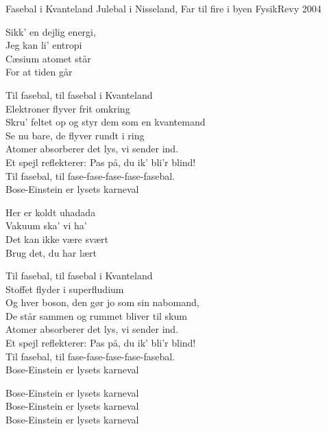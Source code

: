 \begin{song}{Fasebal i Kvanteland}
  {} %
  {Julebal i Nisseland, Far til fire i byen} %
  {} %
  {FysikRevy 2004} %
  {\NotCCLIed} %

  \begin{SBVerse}
    Sikk' en dejlig energi,\\
    Jeg kan li' entropi\\
    Cæsium atomet står\\
    For at tiden går
  \end{SBVerse}

  \begin{SBChorus}
    Til fasebal, til fasebal i Kvanteland\\
    Elektroner flyver frit omkring\\
    Skru' feltet op og styr dem som en kvantemand\\
    Se nu bare, de flyver rundt i ring\\\medskip
    Atomer absorberer det lys, vi sender ind.\\
    Et spejl reflekterer: Pas på, du ik' bli'r blind!\\
    Til fasebal, til fase-fase-fase-fase-fasebal.\\
    Bose-Einstein er lysets karneval
  \end{SBChorus}

  \begin{SBVerse}
    Her er koldt uhadada\\
    Vakuum ska' vi ha'\\
    Det kan ikke være svært\\
    Brug det, du har lært
  \end{SBVerse}

  \begin{SBChorus}
    Til fasebal, til fasebal i Kvanteland\\
    Stoffet flyder i superfludium\\
    Og hver boson, den gør jo som sin nabomand,\\
    De står sammen og rummet bliver til skum\\\medskip
    Atomer absorberer det lys, vi sender ind.\\
    Et spejl reflekterer: Pas på, du ik' bli'r blind!\\
    Til fasebal, til fase-fase-fase-fase-fasebal.\\
    Bose-Einstein er lysets karneval
  \end{SBChorus}

  \begin{SBSection*}
    Bose-Einstein er lysets karneval\\
    Bose-Einstein er lysets karneval\\
    Bose-Einstein er lysets karneval
  \end{SBSection*}
\end{song}
